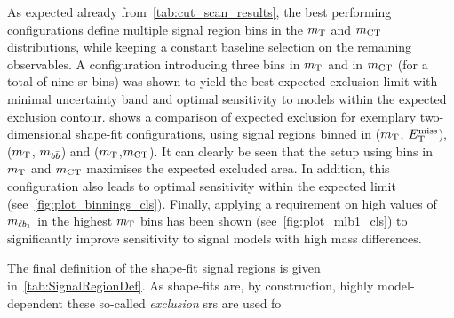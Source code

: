 As expected already from~\cref{tab:cut_scan_results}, the best performing configurations define multiple signal region bins in the $m_{\textrm{T}}$ and $m_{\textrm{CT}}$ distributions, while keeping a constant baseline selection on the remaining observables. A configuration introducing three bins in $m_{\textrm{T}}$ and in $m_{\textrm{CT}}$ (for a total of nine \gls{sr} bins) was shown to yield the best expected exclusion limit with minimal uncertainty band and optimal sensitivity to models within the expected exclusion contour.  shows a comparison of expected exclusion for exemplary two-dimensional shape-fit configurations, using signal regions binned in ($m_{\textrm{T}}$, $E_{\textrm{T}}^{\textrm{miss}}$), ($m_{\textrm{T}}$, $m_{b\bar{b}}$) and ($m_{\textrm{T}}$,$m_{\textrm{CT}}$). It can clearly be seen that the setup using bins in $m_{\textrm{T}}$ and $m_{\textrm{CT}}$ maximises the expected excluded area. In addition, this configuration also leads to optimal sensitivity within the expected limit (see~\cref{fig:plot_binnings_cls}). Finally, applying a requirement on high values of $m_{\ell b_{1}}$ in the highest $m_{\textrm{T}}$ bins has been shown (see~\cref{fig:plot_mlb1_cls}) to significantly improve sensitivity to signal models with high mass differences. 

The final definition of the shape-fit signal regions is given in~\cref{tab:SignalRegionDef}. As shape-fits are, by construction, highly model-dependent these so-called \textit{exclusion} \glspl{sr} are used fo 

